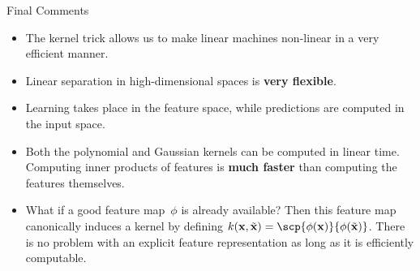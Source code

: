 \documentclass[11pt,compress,t,notes=noshow, xcolor=table]{beamer}
\begin{document}
\begin{vbframe}{Final Comments}

\begin{itemize}
\item The kernel trick allows us to make linear machines non-linear in a very
  efficient manner.
\item Linear separation in high-dimensional spaces is \textbf{very flexible}.

  \item Learning takes place in the feature space, while predictions are computed in the input space.
  \item Both the polynomial and Gaussian kernels can be computed in linear time. Computing inner products of features is \textbf{much faster} than computing the features themselves.
\item What if a good feature map~$\phi$ is already available?
Then this feature map canonically induces a kernel by
defining $k(\xv, \tilde \xv) = \scp{\phi(\xv)}{\phi(\tilde \xv)}$.
There is no problem with an explicit feature representation
as long as it is efficiently computable.
\end{itemize}
\end{vbframe}


\endlecture
\end{document}
